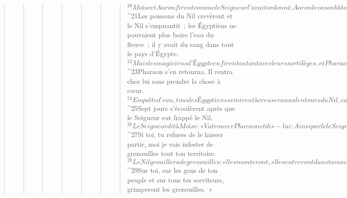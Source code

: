 \begin{verse}
\begin{verse}
\begin{verse}
\begin{verse}
\begin{verse}
\begin{verse}
\begin{verse}
${}^{20}Moïse et Aaron firent comme le Seigneur l’avait ordonné. Aaron leva son bâton et frappa les eaux du Nil sous les yeux de Pharaon et de ses serviteurs, et toutes les eaux du Nil se changèrent en sang. 
${}^{21}Les poissons du Nil crevèrent et le Nil s’empuantit ; les Égyptiens ne pouvaient plus boire l’eau du fleuve ; il y avait du sang dans tout le pays d’Égypte. 
${}^{22}Mais les magiciens d’Égypte en firent autant avec leurs sortilèges, et Pharaon s’obstina ; il n’écouta pas Moïse et Aaron, ainsi que l’avait annoncé le Seigneur.
${}^{23}Pharaon s’en retourna. Il rentra chez lui sans prendre la chose à cœur. 
${}^{24}En quête d’eau, tous les Égyptiens se mirent à creuser aux alentours du Nil, car ils ne pouvaient plus boire les eaux du fleuve. 
${}^{25}Sept jours s’écoulèrent après que le Seigneur eut frappé le Nil.
${}^{26}Le Seigneur dit à Moïse : « Va trouver Pharaon et dis-lui : Ainsi parle le Seigneur : “Laisse partir mon peuple, afin qu’il me serve.” 
${}^{27}Si toi, tu refuses de le laisser partir, moi je vais infester de grenouilles tout ton territoire. 
${}^{28}Le Nil grouillera de grenouilles ; elles monteront, elles entreront dans ta maison, dans ta chambre à coucher, sur ton lit, dans les maisons de tes serviteurs et de ton peuple, dans tes fours et dans tes pétrins. 
${}^{29}Sur toi, sur les gens de ton peuple et sur tous tes serviteurs, grimperont les grenouilles. »
      

\end{verse}
\end{verse}
\end{verse}
\end{verse}
\end{verse}
\end{verse}
\end{verse}
